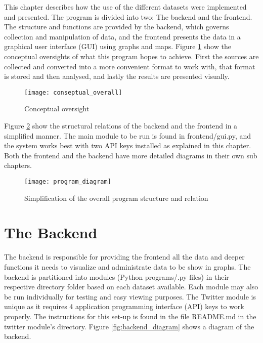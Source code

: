 This chapter describes how the use of the different datasets were implemented and presented. The program is divided into two: The backend and the frontend. The structure and functions are provided by the backend, which governs collection and manipulation of data, and the frontend presents the data in a graphical user interface (GUI) using graphs and maps. 
Figure \ref{fig:Conceptual_o} show the conceptual oversights of what this program hopes to achieve. First the sources are collected and converted into a more convenient format to work with, that format is stored and then analysed, and lastly the results are presented visually.

\begin{figure}[h]
\texttt{[image: conseptual\_overall]}
\centering
\caption{Conceptual oversight}
\label{fig:Conceptual_o}
\end{figure}


\newpage


Figure \ref{fig:program} show the structural relations of the backend and the frontend in a simplified manner. The main module to be run is found in frontend/gui.py, and the system works best with two API keys installed as explained in this chapter. Both the frontend and the backend have more detailed diagrams in their own sub chapters.

\begin{figure}[h]
\texttt{[image: program\_diagram]}
\centering
\caption{Simplification of the overall program structure and relation}
\label{fig:program}
\end{figure}


\newpage



\section{The Backend}
The backend is responsible for providing the frontend all the data and deeper functions it needs to visualize and administrate data to be show in graphs. The backend is partitioned into modules (Python programs/.py files) in their respective directory folder based on each dataset available. Each module may also be run individually for testing and easy viewing purposes. 
The Twitter module is unique as it requires 4 application programming interface (API) keys to work properly. The instructions for this set-up is found in the file README.md in the twitter module's directory. Figure \ref{fig:backend_diagram} shows a diagram of the backend.


